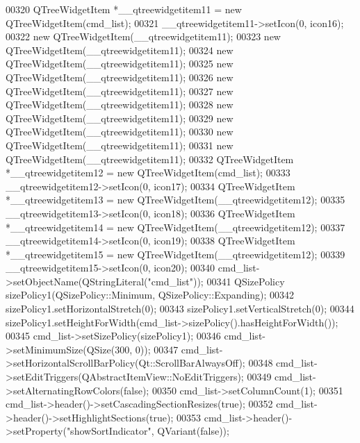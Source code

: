 \begin{DoxyCode}
00320         QTreeWidgetItem *\_\_qtreewidgetitem11 = \textcolor{keyword}{new} QTreeWidgetItem(cmd\_list);
00321         \_\_qtreewidgetitem11->setIcon(0, icon16);
00322         \textcolor{keyword}{new} QTreeWidgetItem(\_\_qtreewidgetitem11);
00323         \textcolor{keyword}{new} QTreeWidgetItem(\_\_qtreewidgetitem11);
00324         \textcolor{keyword}{new} QTreeWidgetItem(\_\_qtreewidgetitem11);
00325         \textcolor{keyword}{new} QTreeWidgetItem(\_\_qtreewidgetitem11);
00326         \textcolor{keyword}{new} QTreeWidgetItem(\_\_qtreewidgetitem11);
00327         \textcolor{keyword}{new} QTreeWidgetItem(\_\_qtreewidgetitem11);
00328         \textcolor{keyword}{new} QTreeWidgetItem(\_\_qtreewidgetitem11);
00329         \textcolor{keyword}{new} QTreeWidgetItem(\_\_qtreewidgetitem11);
00330         \textcolor{keyword}{new} QTreeWidgetItem(\_\_qtreewidgetitem11);
00331         \textcolor{keyword}{new} QTreeWidgetItem(\_\_qtreewidgetitem11);
00332         QTreeWidgetItem *\_\_qtreewidgetitem12 = \textcolor{keyword}{new} QTreeWidgetItem(cmd\_list);
00333         \_\_qtreewidgetitem12->setIcon(0, icon17);
00334         QTreeWidgetItem *\_\_qtreewidgetitem13 = \textcolor{keyword}{new} QTreeWidgetItem(\_\_qtreewidgetitem12);
00335         \_\_qtreewidgetitem13->setIcon(0, icon18);
00336         QTreeWidgetItem *\_\_qtreewidgetitem14 = \textcolor{keyword}{new} QTreeWidgetItem(\_\_qtreewidgetitem12);
00337         \_\_qtreewidgetitem14->setIcon(0, icon19);
00338         QTreeWidgetItem *\_\_qtreewidgetitem15 = \textcolor{keyword}{new} QTreeWidgetItem(\_\_qtreewidgetitem12);
00339         \_\_qtreewidgetitem15->setIcon(0, icon20);
00340         cmd\_list->setObjectName(QStringLiteral(\textcolor{stringliteral}{"cmd\_list"}));
00341         QSizePolicy sizePolicy1(QSizePolicy::Minimum, QSizePolicy::Expanding);
00342         sizePolicy1.setHorizontalStretch(0);
00343         sizePolicy1.setVerticalStretch(0);
00344         sizePolicy1.setHeightForWidth(cmd\_list->sizePolicy().hasHeightForWidth());
00345         cmd\_list->setSizePolicy(sizePolicy1);
00346         cmd\_list->setMinimumSize(QSize(300, 0));
00347         cmd\_list->setHorizontalScrollBarPolicy(Qt::ScrollBarAlwaysOff);
00348         cmd\_list->setEditTriggers(QAbstractItemView::NoEditTriggers);
00349         cmd\_list->setAlternatingRowColors(\textcolor{keyword}{false});
00350         cmd\_list->setColumnCount(1);
00351         cmd\_list->header()->setCascadingSectionResizes(\textcolor{keyword}{true});
00352         cmd\_list->header()->setHighlightSections(\textcolor{keyword}{true});
00353         cmd\_list->header()->setProperty(\textcolor{stringliteral}{"showSortIndicator"}, QVariant(\textcolor{keyword}{false}));

\end{DoxyCode}
